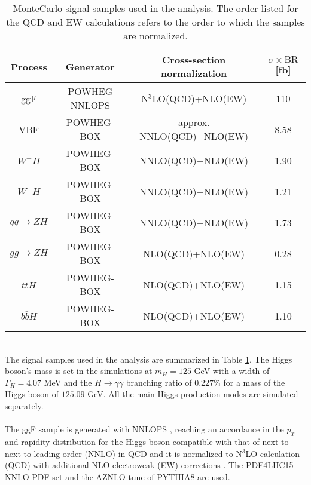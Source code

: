 \begin{table}[h]
\caption{MonteCarlo signal samples used in the analysis. The order listed for the QCD and EW calculations refers to the order to which the samples are normalized.}
\label{signal_samples}
\begin{center}
\begin{tabular}{ c | c | c | c}
  Process & Generator & Cross-section normalization & $\sigma \times \text{BR}$[fb] \\
  \hline			
  ggF & P{\scriptsize OWHEG} NNLOPS & N$^3$LO(QCD)+NLO(EW) & 110 \\
  VBF & P{\scriptsize OWHEG}-B{\scriptsize OX} & approx. NNLO(QCD)+NLO(EW) & 8.58 \\
  $W^+H$ & P{\scriptsize OWHEG}-B{\scriptsize OX} & NNLO(QCD)+NLO(EW) & 1.90 \\
  $W^-H$ & P{\scriptsize OWHEG}-B{\scriptsize OX} & NNLO(QCD)+NLO(EW) & 1.21 \\
  $q\bar{q} \rightarrow ZH$ & P{\scriptsize OWHEG}-B{\scriptsize OX} & NNLO(QCD)+NLO(EW) & 1.73 \\
  $gg \rightarrow ZH$ & P{\scriptsize OWHEG}-B{\scriptsize OX} & NLO(QCD)+NLO(EW) & 0.28 \\
  $t\bar{t}H$ & P{\scriptsize OWHEG}-B{\scriptsize OX} & NLO(QCD)+NLO(EW) & 1.15 \\
  $b\bar{b}H$ & P{\scriptsize OWHEG}-B{\scriptsize OX} & NLO(QCD)+NLO(EW) & 1.10
\end{tabular}
\end{center}
\end{table}
\\The signal samples used in the analysis are summarized in Table \ref{signal_samples}. The Higgs boson's mass is set in the simulations at $m_H = 125$ GeV with a width of $\Gamma_H = 4.07$ MeV and the $H \rightarrow \gamma\gamma$ branching ratio of $0.227 \%$ for a mass of the Higgs boson of $125.09$ GeV. All the main Higgs production modes are simulated separately.
\\\\
The ggF sample is generated with NNLOPS \cite{Hamilton_2013}, reaching an accordance in the $p_T$ and rapidity distribution for the Higgs boson compatible with that of next-to-next-to-leading order (NNLO) in QCD and it is normalized to N$^3$LO calculation (QCD) with additional NLO electroweak (EW) corrections \cite{Actis_2008ug, Anastasiou2018MixedQC, Bonetti_2018}. The PDF4LHC15 NNLO PDF \cite{Butterworth_2015oua} set and the AZNLO \cite{Aad_2014} tune of P{\scriptsize YTHIA}8 \cite{Sj_strand_2008} are used.
